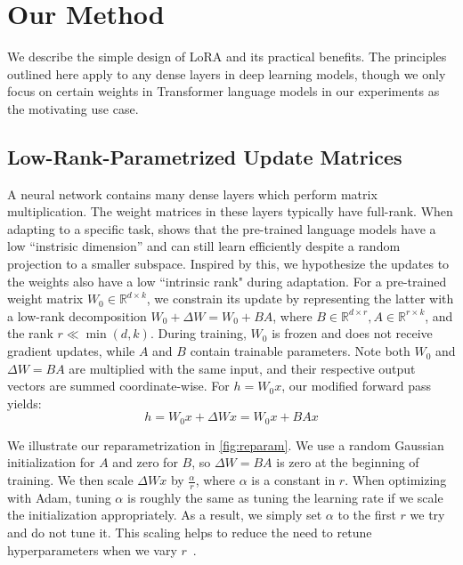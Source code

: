 \documentclass{article} %
\begin{document}
\section{Our Method}

We describe the simple design of LoRA and its practical benefits.
The principles outlined here apply to any dense layers in deep learning models, though we only focus on certain weights in Transformer language models in our experiments as the motivating use case.

\subsection{Low-Rank-Parametrized Update Matrices}
A neural network contains many dense layers which perform matrix multiplication.
The weight matrices in these layers typically have full-rank.
When adapting to a specific task, \citet{aghajanyan_intrinsic_2020} shows that the pre-trained language models have a low ``instrisic dimension'' and can still learn efficiently despite a random projection to a smaller subspace.
Inspired by this, we hypothesize the updates to the weights also have a low ``intrinsic rank" during adaptation.
For a pre-trained weight matrix $W_0\in \mathbb{R}^{d\times k}$, we constrain its update by representing the latter with a low-rank decomposition $W_0+\Delta W=W_0+BA$, where $B\in \mathbb{R}^{d\times r}, A\in \mathbb{R}^{r\times k}$, and the rank $r \ll \min(d,k)$.
During training, $W_0$ is frozen and does not receive gradient updates, while $A$ and $B$ contain trainable parameters.
Note both $W_0$ and $\Delta W=BA$ are multiplied with the same input, and their respective output vectors are summed coordinate-wise.
For $h = W_0x$, our modified forward pass yields:
\begin{equation}
h = W_0 x + \Delta W x = W_0 x + BA x
\label{eq:lora}
\end{equation}

We illustrate our reparametrization in \autoref{fig:reparam}.
We use a random Gaussian initialization for $A$ and zero for $B$, so $\Delta W=BA$ is zero at the beginning of training.
We then scale $\Delta W x$ by $\frac{\alpha}{r}$, where $\alpha$ is a constant in $r$.
When optimizing with Adam, tuning $\alpha$ is roughly the same as tuning the learning rate if we scale the initialization appropriately.
As a result, we simply set $\alpha$ to the first $r$ we try and do not tune it.
This scaling helps to reduce the need to retune hyperparameters when we vary $r$~\citep{yang_feature_2021}.
\end{document}
